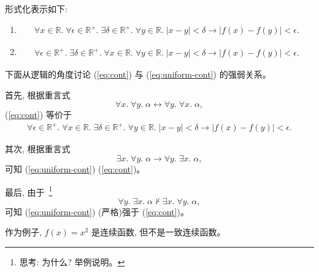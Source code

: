 \documentclass[a4paper, justified]{tufte-handout}
\begin{document}
\begin{solution}
  形式化表示如下:
  \setcounter{equation}{0}
  \begin{enumerate}[(1)]
    \item
      \begin{align}
        \forall x \in \mathbb{R}.\; \forall \epsilon \in \mathbb{R}^{+}.\;
          \exists \delta \in \mathbb{R}^{+}.\;
          \forall y \in \mathbb{R}.\; |x - y| < \delta \to |f(x) - f(y)| < \epsilon.
        \label{eq:cont}
      \end{align}


    \item
      \begin{align}
        \forall \epsilon \in \mathbb{R}^{+}.\; \exists \delta \in \mathbb{R}^{+}.\;
          \forall x \in \mathbb{R}.\; \forall y \in \mathbb{R}.\; |x - y| < \delta \to |f(x) - f(y)| < \epsilon.
        \label{eq:uniform-cont}
      \end{align}
  \end{enumerate}
  下面从逻辑的角度讨论 (\ref{eq:cont}) 与 (\ref{eq:uniform-cont}) 的强弱关系。

  首先, 根据重言式
  \[
    \forall x.\; \forall y.\; \alpha \leftrightarrow \forall y.\; \forall x.\; \alpha,
  \]
  (\ref{eq:cont}) 等价于
  \begin{align*}
    \forall \epsilon \in \mathbb{R}^{+}.\; \forall x \in \mathbb{R}.\;
      \exists \delta \in \mathbb{R}^{+}.\;
      \forall y \in \mathbb{R}.\; |x - y| < \delta \to |f(x) - f(y)| < \epsilon.
  \end{align*}

  其次, 根据重言式
  \[
    \exists x.\; \forall y.\; \alpha \to \forall y.\; \exists x.\; \alpha,
  \]
  可知 (\ref{eq:uniform-cont})  (\ref{eq:cont})。

  最后, 由于~\footnote{思考: 为什么? 举例说明。}
  \[
    \forall y.\; \exists x.\; \alpha \nvdash \exists x.\; \forall y.\; \alpha,
  \]
  可知 (\ref{eq:uniform-cont}) (严格)强于 (\ref{eq:cont})。

  作为例子, $f(x) = x^{2}$ 是连续函数, 但不是一致连续函数。
\end{solution}
\end{document}
